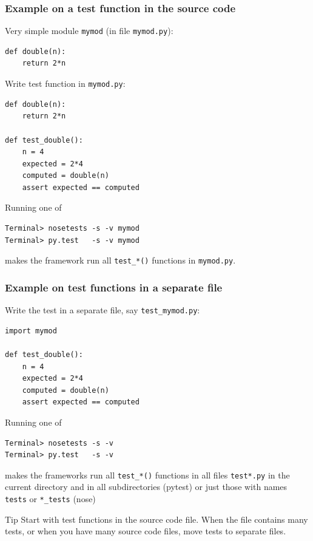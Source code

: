 \documentclass{beamer}
\begin{document}
\begin{frame}
\frametitle{Example on a test function in the source code}

Very simple module \texttt{mymod} (in file \texttt{mymod.py}):

\begin{verbatim}
def double(n):
    return 2*n
\end{verbatim}

Write test function in \texttt{mymod.py}:

\begin{verbatim}
def double(n):
    return 2*n

def test_double():
    n = 4
    expected = 2*4
    computed = double(n)
    assert expected == computed
\end{verbatim}

Running one of

\begin{verbatim}
Terminal> nosetests -s -v mymod
Terminal> py.test   -s -v mymod
\end{verbatim}
makes the framework run all \Verb!test_*()! functions in \texttt{mymod.py}.
\end{frame}

\begin{frame}
\frametitle{Example on test functions in a separate file}

Write the test in a separate file, say \Verb!test_mymod.py!:

\begin{verbatim}
import mymod

def test_double():
    n = 4
    expected = 2*4
    computed = double(n)
    assert expected == computed
\end{verbatim}

Running one of

\begin{verbatim}
Terminal> nosetests -s -v
Terminal> py.test   -s -v
\end{verbatim}
makes the frameworks run all \Verb!test_*()! functions in all files
\texttt{test*.py} in the current directory and in all subdirectories (pytest)
or just those with names \texttt{tests} or \Verb!*_tests! (nose)

\begin{block}{Tip }
Start with test functions in the source code file. When the file
contains many tests, or when you have many source code files,
move tests to separate files.
\end{block}
\end{frame}
\end{document}
